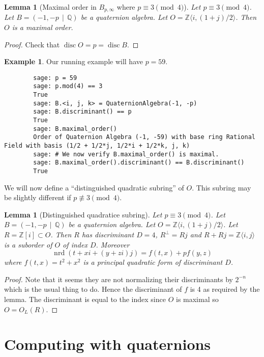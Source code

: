 \documentclass[10pt]{article}
\theoremstyle{plain}
\newtheorem{lemma}[theorem]{Lemma}
\theoremstyle{definition}
\newtheorem{example}[theorem]{Example}
\newcommand{\op}{\operatorname}
\newcommand{\Z}{\mathbb{Z}}
\newcommand{\Q}{\mathbb{Q}}
\newcommand{\nrd}{\op{nrd}}
\newcommand{\disc}{\op{disc}}
\begin{document}
\begin{lemma}[Maximal order in \( B_{p, \infty} \) where \( p \equiv 3 \pmod{4} \)]
    Let \( p \equiv 3 \pmod{4} \).
    Let \( B =  (-1, -p \, \mid \, \Q) \) be a quaternion algebra.
    Let \( O = \Z \langle i, (1+j) / 2 \rangle \).
    Then \( O \) is a maximal order.
\end{lemma}
\begin{proof}
    Check that \( \disc O  = p = \disc B\).
\end{proof}

\begin{example}
    Our running example will have \( p = 59 \).
    \begin{lstlisting}
        sage: p = 59
        sage: p.mod(4) == 3
        True 
        sage: B.<i, j, k> = QuaternionAlgebra(-1, -p)
        sage: B.discriminant() == p
        True
        sage: B.maximal_order()
        Order of Quaternion Algebra (-1, -59) with base ring Rational Field with basis (1/2 + 1/2*j, 1/2*i + 1/2*k, j, k)
        sage: # We now verify B.maximal_order() is maximal.
        sage: B.maximal_order().discriminant() == B.discriminant()
        True
    \end{lstlisting}
\end{example}

We will now define a ``distinguished quadratic subring'' of \( O \).
This subring may be slightly different if \( p \not\equiv 3 \pmod{4} \).

\begin{lemma}[Distinguished quadratice subring]
    Let \( p \equiv 3 \pmod{4} \).
    Let \( B =  (-1, -p \, \mid \, \Q) \) be a quaternion algebra.
    Let \( O = \Z \langle i, (1+j) / 2 \rangle \).
    Let \( R = \Z[i] \subset O \).
    Then \( R \) has discriminant \( D = 4 \), \( R^\perp = Rj \) and \( R + Rj = \Z\langle i, j \rangle\) is a suborder of \( O \) of index \( D \).
    Moreover
    \[
        \nrd(t + xi + (y + zi)j) = f(t, x) + p f(y, z)
    \]
    where \( f(t, x) = t^2 + x^2 \) is a principal quadratic form of discriminant \( D \).
\end{lemma}
\begin{proof}
    Note that it seems they are not normalizing their discriminants by \( 2^{-n} \) which is the usual thing to do.
    Hence the discriminant of \( f \) is 4 as required by the lemma.
    The discriminant is equal to the index since \( O \) is maximal so \( O = O_L(R) \).
\end{proof}


\section{Computing with quaternions}
\end{document}
